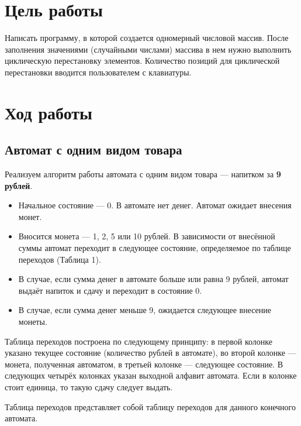 \section{Цель работы}
Написать программу, в которой создается одномерный числовой массив. После заполнения значениями (случайными числами) массива в нем нужно выполнить циклическую перестановку элементов. Количество позиций для циклической перестановки вводится пользователем с клавиатуры.



\section{Ход работы}

\subsection{Автомат с одним видом товара}

Реализуем алгоритм работы автомата с одним видом товара — напитком за \textbf{9 рублей}.
\begin{itemize}
    \item Начальное состояние — 0. В автомате нет денег. Автомат ожидает внесения монет.
    \item Вносится монета — 1, 2, 5 или 10 рублей. В зависимости от внесённой суммы автомат переходит в следующее состояние, определяемое по таблице переходов (Таблица 1).
    \item В случае, если сумма денег в автомате больше или равна 9 рублей, автомат выдаёт напиток и сдачу и переходит в состояние 0.
    \item В случае, если сумма денег меньше 9, ожидается следующее внесение монеты.
\end{itemize}

Таблица переходов построена по следующему принципу: в первой колонке указано текущее состояние (количество рублей в автомате), во второй колонке — монета, полученная автоматом, в третьей колонке — следующее состояние. В следующих четырёх колонках указан выходной алфавит автомата. Если в колонке стоит единица, то такую сдачу следует выдать.

Таблица переходов представляет собой таблицу переходов для данного конечного автомата.

